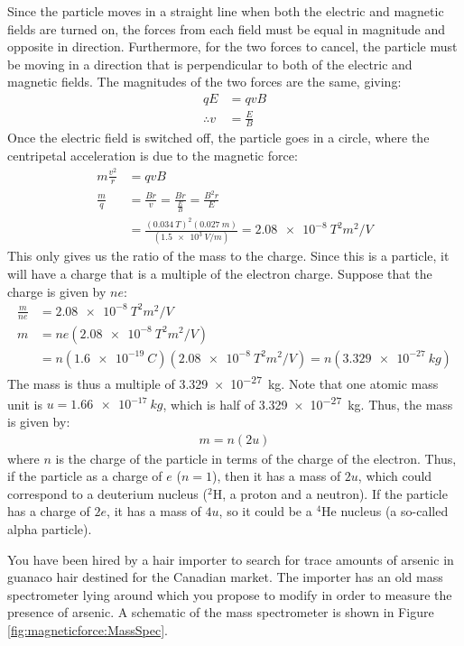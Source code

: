 \begin{solution}
Since the particle moves in a straight line when both the electric and magnetic fields are turned on, the forces from each field must be equal in magnitude and opposite in direction. Furthermore, for the two forces to cancel, the particle must be moving in a direction that is perpendicular to both of the electric and magnetic fields. The magnitudes of the two forces are the same, giving:
\begin{align*}
qE&=qvB\\
\therefore v&=\frac{E}{B}
\end{align*}
Once the electric field is switched off, the particle goes in a circle, where the centripetal acceleration is due to the magnetic force:
\begin{align*}
m\frac{v^2}{r}&=qvB\\
\frac{m}{q}&=\frac{Br}{v}=\frac{Br}{\frac{E}{B}}=\frac{B^2r}{E}\\
&=\frac{(\SI{0.034}{T})^2(\SI{0.027}{m})}{(\SI{1.5e3}{V/m})}=\SI{2.08e-8}{T^2m^2/V}
\end{align*}
This only gives us the ratio of the mass to the charge. Since this is a particle, it will have a charge that is a multiple of the electron charge. Suppose that the charge is given by $ne$:
\begin{align*}
\frac{m}{ne}&=\SI{2.08e-8}{T^2m^2/V}\\
m&=ne(\SI{2.08e-8}{T^2m^2/V})\\
&=n(\SI{1.6e-19}{C})(\SI{2.08e-8}{T^2m^2/V})=n(\SI{3.329e-27}{kg})
\end{align*}
The mass is thus a multiple of \SI{3.329e-27}{kg}. Note that one atomic mass unit is $u=\SI{1.66e-17}{kg}$, which is half of \SI{3.329e-27}{kg}. Thus, the mass is given by:
\begin{align*}
m=n (2u)
\end{align*}
where $n$ is the charge of the particle in terms of the charge of the electron. Thus, if the particle as a charge of $e$ ($n=1$), then it has a mass of $2u$, which could correspond to a deuterium nucleus ($^2$H, a proton and a neutron). If the particle has a charge of $2e$, it has a mass of $4u$, so it could be a $^4$He nucleus (a so-called alpha particle). 
\end{solution}

\question You have been hired by a hair importer to search for trace amounts of arsenic in guanaco hair destined for the Canadian market. The importer has an old mass spectrometer lying around which you propose to modify in order to measure the presence of arsenic. A schematic of the mass spectrometer is shown in Figure \ref{fig:magneticforce:MassSpec}.

